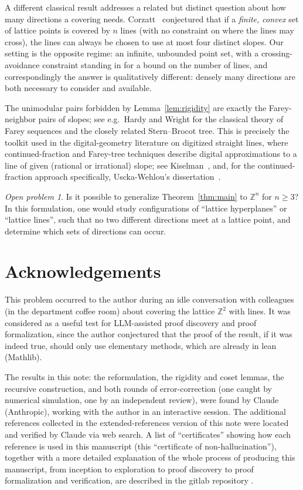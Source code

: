 \documentclass[a4paper,11pt,oneside,reqno]{amsart}
\theoremstyle{definition}
\theoremstyle{remark}
\newtheorem{openproblem}[definition]{Open problem}
\theoremstyle{plain}
\newcommand{\Z}{\mathbb{Z}}
\begin{document}
A different classical result addresses a related but distinct question about how many directions a
covering needs. Corzatt~\cite{Corzatt1985} conjectured that if a \emph{finite, convex} set of lattice
points is covered by \(n\) lines (with no constraint on where the lines may cross), the lines can
always be chosen to use at most four distinct slopes. Our setting is the opposite regime: an
infinite, unbounded point set, with a crossing-avoidance constraint standing in for a bound on the
number of lines, and correspondingly the answer is qualitatively different: densely many
directions are both necessary to consider and available.

The unimodular pairs forbidden by Lemma~\ref{lem:rigidity} are exactly the Farey-neighbor pairs of
slopes; see e.g.\ Hardy and Wright \cite[Ch.~III]{HardyWright2008} for the classical theory of
Farey sequences and the closely related Stern--Brocot tree. This is precisely the toolkit used in
the digital-geometry literature on digitized straight lines, where continued-fraction and
Farey-tree techniques describe digital approximations to a line of given (rational or irrational)
slope; see Kiselman~\cite{Kiselman2022}, and, for the continued-fraction approach specifically,
Uscka-Wehlou's dissertation~\cite{UsckaWehlou2009}.

\begin{openproblem}
  Is it possible to generalize Theorem~\ref{thm:main} to \(\Z^n\) for \(n\ge3\)? In this formulation,
  one would study configurations of ``lattice hyperplanes'' or ``lattice lines'', such that no two
  different directions meet at a lattice point, and determine which sets of directions can occur.
\end{openproblem}

\section*{Acknowledgements}

This problem occurred to the author during an idle conversation with colleagues
(in the department coffee room) about covering the lattice \(\Z^2\) with lines.
It was considered as a useful test for LLM-assisted proof discovery and proof
formalization, since the author conjectured that the proof of the result,
if it was indeed true, should only use elementary methods, which are already in
lean (Mathlib).

The results in this note: the reformulation, the
rigidity and coset lemmas, the recursive construction, and both rounds of
error-correction (one caught by numerical simulation, one by an independent
review), were found by Claude (Anthropic), working with the author in an
interactive session. The additional references collected in the
extended-references version of this note were located and verified by Claude via
web search. A list of ``certificates'' showing how each reference is used in this manuscript (this
``certificate of non-hallucination''), together with a more detailed explanation of the whole
process of producing this manuscript, from inception to exploration to proof discovery to proof
formalization and verification, are described in the gitlab repository \cite{gitrepo}.
\end{document}
